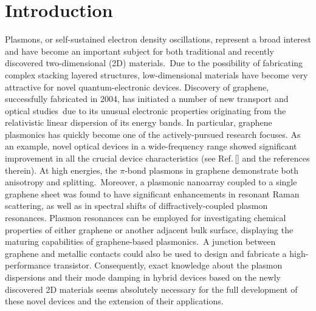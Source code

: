 \documentclass[aps,prb,showpacs]{revtex4}
\begin{document}

\maketitle

\section{Introduction}
\label{sect1}

Plasmons, or self-sustained electron density oscillations, represent a broad interest and have
become an important subject for both traditional and recently discovered two-dimensional (2D) materials.\,\cite{fstern,
SDS07,wunsch,pavlo1,stauber1,stauber2,SDSft,mos2} Due to the possibility of fabricating complex stacking layered structures, 
low-dimensional materials have become very attractive for novel quantum-electronic devices. 
Discovery of graphene, successfully fabricated in 2004, has initiated a number of new
transport and optical studies\,\cite{gr1,gr2,gr3} due to its unusual 
electronic properties originating from the relativistic linear dispersion of its energy bands. 
In particular, graphene plasmonics has quickly become one of the actively-pursued research focuses. 
As an example, novel optical devices in a wide-frequency range showed 
significant improvement in all the crucial device characteristics (see Ref.\,[] and the references
therein). At high energies, the $\pi$-bond plasmons in graphene demonstrate 
both anisotropy and splitting.\,\cite{desp} Moreover, a plasmonic nanoarray coupled to a single graphene sheet was found to have significant 
enhancements in resonant Raman scattering, as well as in 
spectral shifts of diffractively-coupled plasmon resonances. 
Plasmon resonances can be employed for investigating chemical properties of either graphene or another adjacent bulk surface, 
displaying the maturing capabilities of graphene-based plasmonics.\,\cite{poliNS,PNS01,PNS02,PNS03,yan} 
A junction between graphene and metallic contacts could also be used to 
design and fabricate a high-performance transistor. Consequently, exact knowledge
about the plasmon dispersions and their mode damping in hybrid devices based on the newly discovered 2D materials seems
absolutely necessary for the full development of these novel devices and the extension of their applications.\,\cite{rev1,rev2} 
\medskip
\end{document}
